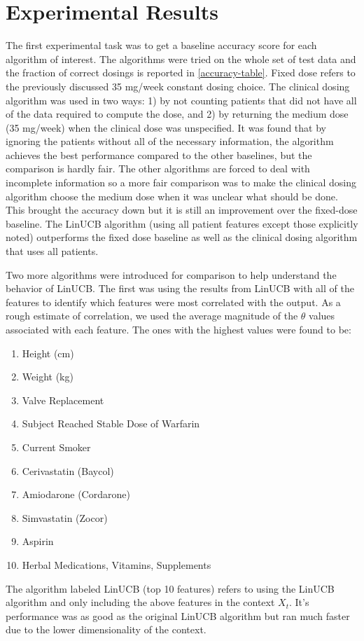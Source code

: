\documentclass{article}
\begin{document}
\section{Experimental Results}
\label{experiment}
The first experimental task was to get a baseline accuracy score for each algorithm of interest. The algorithms were tried on the whole set of test data and the fraction of correct dosings is reported in \cref{accuracy-table}. Fixed dose refers to the previously discussed 35 mg/week constant dosing choice. The clinical dosing algorithm was used in two ways: 1) by not counting patients that did not have all of the data required to compute the dose, and 2) by returning the medium dose (35 mg/week) when the clinical dose was unspecified. It was found that by ignoring the patients without all of the necessary information, the algorithm achieves the best performance compared to the other baselines, but the comparison is hardly fair. The other algorithms are forced to deal with incomplete information so a more fair comparison was to make the clinical dosing algorithm choose the medium dose when it was unclear what should be done. This brought the accuracy down but it is still an improvement over the fixed-dose baseline. The LinUCB algorithm (using all patient features except those explicitly noted) outperforms the fixed dose baseline as well as the clinical dosing algorithm that uses all patients.

Two more algorithms were introduced for comparison to help understand the behavior of LinUCB. The first was using the results from LinUCB with all of the features to identify which features were most correlated with the output. As a rough estimate of correlation, we used the average magnitude of the $\theta$ values associated with each feature. The ones with the highest values were found to be:
\begin{enumerate}
    \item Height (cm)
    \item Weight (kg)
    \item Valve Replacement
    \item Subject Reached Stable Dose of Warfarin
    \item Current Smoker
    \item Cerivastatin (Baycol)
    \item Amiodarone (Cordarone)
    \item Simvastatin (Zocor)
    \item Aspirin
    \item Herbal Medications, Vitamins, Supplements
\end{enumerate}
The algorithm labeled LinUCB (top 10 features) refers to using the LinUCB algorithm and only including the above features in the context $X_t$. It's performance was as good as the original LinUCB algorithm but ran much faster due to the lower dimensionality of the context. 
\end{document}
